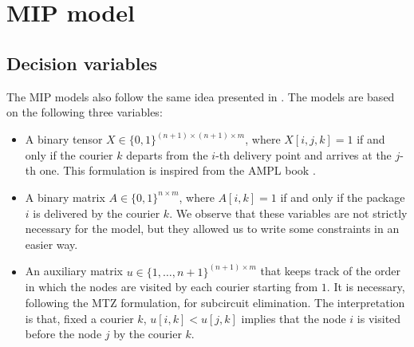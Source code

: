 \section{MIP model}


\subsection{Decision variables}

The MIP models also follow the same idea presented in .
The models are based on the following three variables:
\begin{itemize}
    \item A binary tensor $X \in \{0,1\}^{(n+1) \times (n+1) \times m}$, where $X[i,j,k] = 1$ if and only if the courier $k$ departs from the $i$-th delivery point and arrives at the $j$-th one. This formulation is inspired from the AMPL book \cite{AMPLbook}.

    \item A binary matrix $A \in \{0,1\}^{n \times m}$, where $A[i,k] = 1$ if and only if the package $i$ is delivered by the courier $k$. We observe that these variables are not strictly necessary for the model, but they allowed us to write some constraints in an easier way.

    \item An auxiliary matrix $u \in \{1,\dots,n+1\}^{(n+1) \times m}$ that keeps track of the order in which the nodes are visited by each courier starting from $1$. It is necessary, following the MTZ formulation, for subcircuit elimination. The interpretation is that, fixed a courier $k$, $u[i,k] < u[j,k]$ implies that the node $i$ is visited before the node $j$ by the courier $k$.
\end{itemize}


